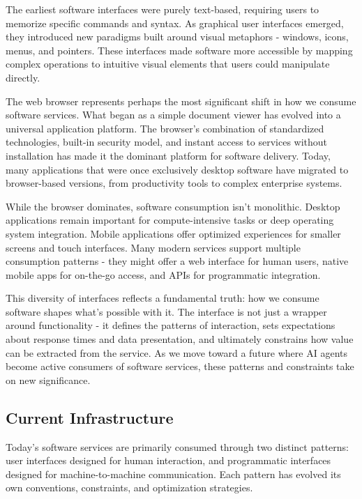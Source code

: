 \documentclass{article}
\begin{document}
The earliest software interfaces were purely text-based, requiring users to memorize specific commands and syntax. As graphical user interfaces emerged, they introduced new paradigms built around visual metaphors - windows, icons, menus, and pointers. These interfaces made software more accessible by mapping complex operations to intuitive visual elements that users could manipulate directly.

The web browser represents perhaps the most significant shift in how we consume software services. What began as a simple document viewer has evolved into a universal application platform. The browser's combination of standardized technologies, built-in security model, and instant access to services without installation has made it the dominant platform for software delivery. Today, many applications that were once exclusively desktop software have migrated to browser-based versions, from productivity tools to complex enterprise systems.

While the browser dominates, software consumption isn't monolithic. Desktop applications remain important for compute-intensive tasks or deep operating system integration. Mobile applications offer optimized experiences for smaller screens and touch interfaces. Many modern services support multiple consumption patterns - they might offer a web interface for human users, native mobile apps for on-the-go access, and APIs for programmatic integration.

This diversity of interfaces reflects a fundamental truth: how we consume software shapes what's possible with it. The interface is not just a wrapper around functionality - it defines the patterns of interaction, sets expectations about response times and data presentation, and ultimately constrains how value can be extracted from the service. As we move toward a future where AI agents become active consumers of software services, these patterns and constraints take on new significance.

\subsection{Current Infrastructure}
\label{subsec:interfaces_current}
Today's software services are primarily consumed through two distinct patterns: user interfaces designed for human interaction, and programmatic interfaces designed for machine-to-machine communication. Each pattern has evolved its own conventions, constraints, and optimization strategies.
\end{document}
